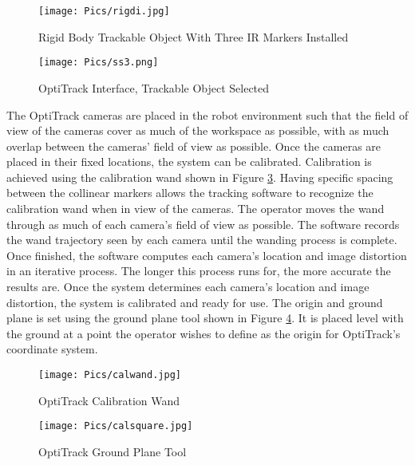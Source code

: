 \begin{figure}
    \centering
    \texttt{[image: Pics/rigdi.jpg]}
    \caption{Rigid Body Trackable Object With Three IR Markers Installed}
    \label{fig:trackable}
\end{figure}
\begin{figure}
    \centering
    \texttt{[image: Pics/ss3.png]}
    \caption{OptiTrack Interface, Trackable Object Selected}
    \label{fig:motivetrackable}
\end{figure}

The OptiTrack cameras are placed in the robot environment such that the field of view of the cameras cover as much of the workspace as possible, with as much overlap between the cameras' field of view as possible. Once the cameras are placed in their fixed locations, the system can be calibrated. Calibration is achieved using the calibration wand shown in Figure \ref{fig:wand}. Having specific spacing between the collinear markers allows the tracking software to recognize the calibration wand when in view of the cameras. The operator moves the wand through as much of each camera's field of view as possible. The software records the wand trajectory seen by each camera until the wanding process is complete. Once finished, the software computes each camera's location and image distortion in an iterative process. The longer this process runs for, the more accurate the results are. Once the system determines each camera's location and image distortion, the system is calibrated and ready for use. The origin and ground plane is set using the ground plane tool shown in Figure \ref{fig:groundplane}. It is placed level with the ground at a point the operator wishes to define as the origin for OptiTrack's coordinate system.\\

\begin{figure}
    \centering
    \texttt{[image: Pics/calwand.jpg]}
    \caption{OptiTrack Calibration Wand \cite{caltools}}
    \label{fig:wand}
\end{figure}
\begin{figure}
    \centering
    \texttt{[image: Pics/calsquare.jpg]}
    \caption{OptiTrack Ground Plane Tool \cite{caltools}}
    \label{fig:groundplane}
\end{figure}

